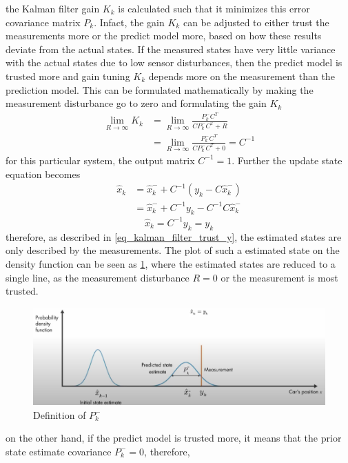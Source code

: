 the Kalman filter gain $K_{k}$ is calculated such that it minimizes this error covariance matrix $P_{k}$. Infact, the gain $K_{k}$ can be adjusted to either trust the measurements more or the predict model more, based on how these results deviate from the actual states. If the measured states have very little variance with the actual states due to low sensor disturbances, then the predict model is trusted more and gain tuning $K_{k}$ depends more on the measurement than the prediction model. This can be formulated mathematically by making the measurement disturbance go to zero and formulating the gain $K_{k}$
\begin{align*}
	\lim_{R\to \infty}K_{k} &= \lim_{R\to \infty}\frac{P^{-}_{k} C^{T}}{C P^{-}_{k} C^{T} + R} \\
							&= \lim_{R\to \infty}\frac{P^{-}_{k} C^{T}}{C P^{-}_{k} C^{T} + 0} = C^{-1}
\end{align*}
for this particular system, the output matrix $C^{-1} = 1$. Further the update state equation becomes
\begin{align*}
	\hat{x}_{k} &= \hat{x}^{-}_{k} + C^{-1}(y_{k} - C\hat{x}^{-}_{k}) \\
				&= \hat{x}^{-}_{k} + C^{-1}y_{k} - C^{-1}C\hat{x}^{-}_{k}
\end{align*}
\begin{equation}\label{eq_kalman_filter_trust_y}
	\hat{x}_{k} = C^{-1}y_{k} = y_{k}
\end{equation}
therefore, as described in \eqref{eq_kalman_filter_trust_y}, the estimated states are only described by the measurements. The plot of such a estimated state on the density function can be seen as \ref{fig_kalman_filter_rust_y}, where the estimated states are reduced to a single line, as the measurement disturbance $R = 0$ or the measurement is most trusted.
\begin{figure}[h!]
	\centering
	\includegraphics[width=\linewidth]{Bilder/kalman_filter_rust_y.png}
	\caption{Definition of $P^{-}_{k}$}
	\label{fig_kalman_filter_rust_y}
\end{figure}
on the other hand, if the predict model is trusted more, it means that the prior state estimate covariance $P^{-}_{k} = 0$, therefore,
